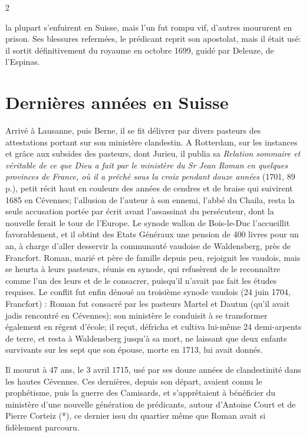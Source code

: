 

{\fontsize{9.65}{11.05}\selectfont
\begin{multicols}{2}

la plupart s’enfuirent en Suisse, mais l’un fut rompu vif, d’autres moururent en prison. Ses blessures refermées, le prédicant reprit son apostolat, mais il était usé: il sortit définitivement du royaume en octobre 1699, guidé par Deleuze, de l’Espinas.

\section*{Dernières années en Suisse}

Arrivé à Lausanne, puis Berne, il se fit délivrer par divers pasteurs des attestations portant sur son ministère clandestin. A Rotterdam, sur les instances et grâce aux subsides des pasteurs, dont Jurieu, il publia sa \textit{Relation sommaire et véritable de ce que Dieu a fait par le ministère du Sr Jean Roman en quelques provinces de France, où il a prêché sous la croix pendant douze années} (1701, 89 p.), petit récit haut en couleurs des années de cendres et de braise qui suivirent 1685 en Cévennes; l’allusion de l’auteur à son ennemi, l’abbé du Chaila, resta la seule accusation portée par écrit avant l’assassinat du persécuteur, dont la nouvelle ferait le tour de l’Europe. Le synode wallon de Bois-le-Duc l’accueillit favorablement, et il obtint des Etats Généraux une pension de 400 livres pour un an, à charge d’aller desservir la communauté vaudoise de Waldensberg, près de Francfort. Roman, marié et père de famille depuis peu, rejoignit les vaudois, mais se heurta à leurs pasteurs, réunis en synode, qui refusèrent de le reconnaître comme l’un des leurs et de le consacrer, puisqu’il n’avait pas fait les études requises. Le conflit fut enfin dénoué au troisième synode vaudois (24 juin 1704, Francfort) : Roman fut consacré par les pasteurs Martel et Dautun (qu’il avait jadis rencontré en Cévennes); son ministère le conduisit à se transformer également en régent d’école; il reçut, défricha et cultiva lui-même 24 demi-arpents de terre, et resta à Waldensberg jusqu’à sa mort, ne laissant que deux enfants survivants sur les sept que son épouse, morte en 1713, lui avait donnés.

Il mourut à 47 ans, le 3 avril 1715, usé par ses douze années de clandestinité dans les hautes Cévennes. Ces dernières, depuis son départ, avaient connu le prophétisme, puis la guerre des Camisards, et s’apprêtaient à bénéficier du ministère d’une nouvelle génération de prédicants, autour d’Antoine Court et de Pierre Corteiz (*), ce dernier issu du quartier même que Roman avait si fidèlement parcouru.


\end{multicols}}
